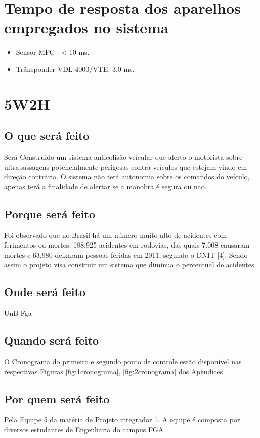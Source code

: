 \section{Tempo de resposta dos aparelhos empregados no sistema}
\begin{itemize}
  \item Sensor MFC \cite{mfc} : < 10 ms.
  \item Trânsponder VDL 4000/VTE: 3,0 ms.
\end{itemize}

\section {5W2H}

\subsection{O que será feito}
Será Construido um sistema anticolisão veícular que alerto o motorista sobre ultrapassagens potencialmente perigosas contra veículos que estejam vindo em direção contrária. O sistema não terá autonomia sobre os comandos do veículo, apenas terá a finalidade de alertar se a manobra é segura ou nao.

\subsection{Porque será feito}
Foi observado que no Brasil há um número muito alto de acidentes com ferimentos ou mortes. 188.925 acidentes em rodovias, das quais 7.008 causaram mortes e 63.980 deixaram pessoas feridas em 2011, segundo o DNIT [4]. Sendo assim o projeto visa construir um sistema que diminua o percentual de acidentes.

\subsection{Onde será feito}
UnB-Fga

\subsection{Quando será feito}
O Cronograma do primeiro e segundo ponto de controle estão disponível nas  respectivas Figuras \ref{fig:1cronograma},
\ref{fig:2cronograma} dos Apêndices

\subsection{Por quem será feito}
Pela Equipe 5 da matéria de Projeto integrador 1. A equipe é composta por diversos estudantes de Engenharia do campus FGA


